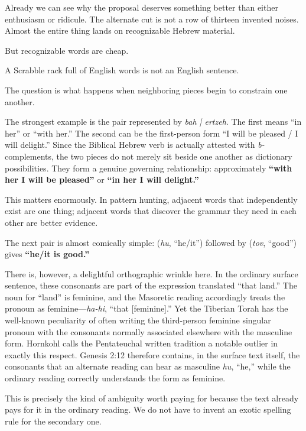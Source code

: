 Already we can see why the proposal deserves something better than either enthusiasm or ridicule. The alternate cut is not a row of thirteen invented noises. Almost the entire thing lands on recognizable Hebrew material.

But recognizable words are cheap.

A Scrabble rack full of English words is not an English sentence.

The question is what happens when neighboring pieces begin to constrain one another.

The strongest example is the pair represented by \textit{bah | ertzeh}. The first means ``in her'' or ``with her.'' The second can be the first-person form ``I will be pleased / I will delight.'' Since the Biblical Hebrew verb is actually attested with \textit{b-} complements, the two pieces do not merely sit beside one another as dictionary possibilities. They form a genuine governing relationship: approximately \textbf{``with her I will be pleased''} or \textbf{``in her I will delight.''}\cite{BDB}

This matters enormously. In pattern hunting, adjacent words that independently exist are one thing; adjacent words that discover the grammar they need in each other are better evidence.

The next pair is almost comically simple:  (\textit{hu}, ``he/it'') followed by  (\textit{tov}, ``good'') gives \textbf{``he/it is good.''}

There is, however, a delightful orthographic wrinkle here. In the ordinary surface sentence, these consonants are part of the expression translated ``that land.'' The noun for ``land'' is feminine, and the Masoretic reading accordingly treats the pronoun as feminine---\textit{ha-hi}, ``that [feminine].'' Yet the Tiberian Torah has the well-known peculiarity of often writing the third-person feminine singular pronoun with the consonants normally associated elsewhere with the masculine form. Hornkohl calls the Pentateuchal written tradition a notable outlier in exactly this respect. Genesis 2:12 therefore contains, in the surface text itself, the consonants that an alternate reading can hear as masculine \textit{hu}, ``he,'' while the ordinary reading correctly understands the form as feminine.\cite{Hornkohl2024,MasoreticGenesis}

This is precisely the kind of ambiguity worth paying for because the text already pays for it in the ordinary reading. We do not have to invent an exotic spelling rule for the secondary one.

